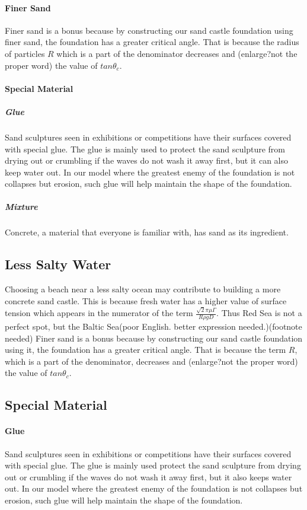\documentclass[12pt]{article}
\begin{document}
\paragraph{Finer Sand}
Finer sand is a bonus because by constructing our sand castle foundation using finer sand, the foundation has a greater critical angle. That is because the radius of particles $R$ which is a part of the denominator decreases and (enlarge?not the proper word) the value of $tan\theta_c$.
\paragraph{Special Material}
\subparagraph{Glue}
Sand sculptures seen in exhibitions or competitions have their surfaces covered with special glue. The glue is mainly used to protect the sand sculpture from drying out or crumbling if the waves do not wash it away first, but it can also keep water out. In our model where the greatest enemy of the foundation is not collapses but erosion, such glue will help maintain the shape of the foundation.
\subparagraph{Mixture}
Concrete, a material that everyone is familiar with, has sand as its ingredient.
\subsection{Less Salty Water}
Choosing a beach near a less salty ocean may contribute to building a more concrete sand castle. This is because fresh water has a higher value of surface tension which appears in the numerator of the term $\frac{\sqrt{2}\pi\mu\Gamma}{R\rho gD}$. Thus Red Sea is not a perfect spot, but the Baltic Sea(poor English. better expression needed.)(footnote needed)
Finer sand is a bonus because by constructing our sand castle foundation using it, the foundation has a greater critical angle. That is because the term $R$, which is a part of the denominator, decreases and (enlarge?not the proper word) the value of $tan\theta_c$.
\subsection{Special Material}
\paragraph{Glue}
Sand sculptures seen in exhibitions or competitions have their surfaces covered with special glue. The glue is mainly used protect the sand sculpture from drying out or crumbling if the waves do not wash it away first, but it also keeps water out. In our model where the greatest enemy of the foundation is not collapses but erosion, such glue will help maintain the shape of the foundation.
\end{document}
